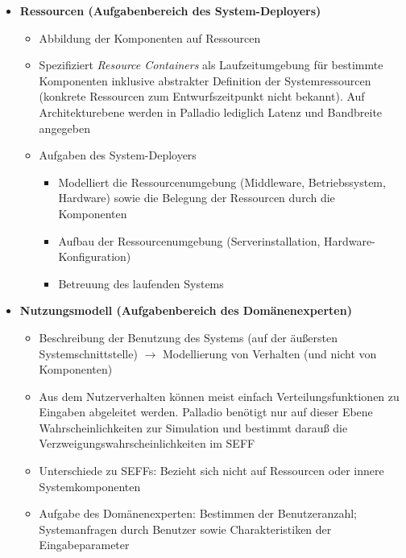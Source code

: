 \begin{itemize}
\begin{itemize}
\begin{itemize}
		\end{itemize}
	\end{itemize}
	\item \textbf{Ressourcen (Aufgabenbereich des System-Deployers)}
	\begin{itemize}
		\item Abbildung der Komponenten auf Ressourcen
		\item Spezifiziert \textit{Resource Containers} als Laufzeitumgebung für bestimmte Komponenten inklusive abstrakter Definition der Systemressourcen (konkrete Ressourcen zum Entwurfszeitpunkt nicht bekannt). Auf Architekturebene werden in Palladio lediglich Latenz und Bandbreite angegeben
		\item Aufgaben des System-Deployers
		\begin{itemize}
			\item Modelliert die Ressourcenumgebung (Middleware, Betriebssystem, Hardware) sowie die Belegung der Ressourcen durch die Komponenten
			\item Aufbau der Ressourcenumgebung (Serverinstallation, Hardware-Konfiguration)
			\item Betreuung des laufenden Systems
		\end{itemize}
	\end{itemize}
	\item \textbf{Nutzungsmodell (Aufgabenbereich des Domänenexperten)}
	\begin{itemize}
		\item Beschreibung der Benutzung des Systems (auf der äußersten Systemschnittstelle) \(\rightarrow\) Modellierung von Verhalten (und nicht von Komponenten)
		\item Aus dem Nutzerverhalten können meist einfach Verteilungsfunktionen zu Eingaben abgeleitet werden. Palladio benötigt nur auf dieser Ebene Wahrscheinlichkeiten zur Simulation und bestimmt darauß die Verzweigungswahrscheinlichkeiten im SEFF
		\item Unterschiede zu SEFFs: Bezieht sich nicht auf Ressourcen oder innere Systemkomponenten
		\item Aufgabe des Domänenexperten: Bestimmen der Benutzeranzahl; Systemanfragen durch Benutzer sowie Charakteristiken der Eingabeparameter
	\end{itemize}
\end{itemize}



